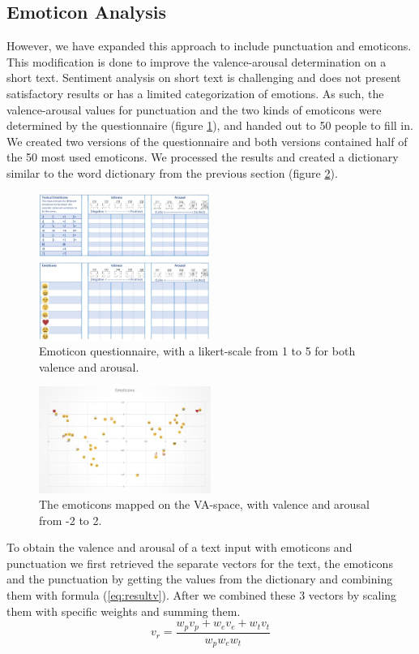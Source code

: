 \documentclass[10pt,journal,compsoc]{IEEEtran}
\begin{document}
\subsection{Emoticon Analysis}
However, we have expanded this approach to include punctuation and emoticons. This modification is done to improve the valence-arousal determination on a short text. Sentiment analysis on short text is challenging and does not present satisfactory results or has a limited categorization of emotions. As such,  the valence-arousal values for punctuation and the two kinds of emoticons were determined by the questionnaire (figure \ref{fig:eq}), and handed out to 50 people to fill in. We created two versions of the questionnaire and both versions contained half of the 50 most used emoticons. We processed the results and created a dictionary similar to the word dictionary from the previous section (figure \ref{fig:emoji}). 
\begin{figure}[h!]
	\centering
	\includegraphics[width=0.5\textwidth]{"EmoticonQuestionnaire"}
	\caption{Emoticon questionnaire, with a likert-scale from 1 to 5 for both valence and arousal.}
	\label{fig:eq}
\end{figure}
\begin{figure}[h!]
	\centering
	\includegraphics[width=0.5\textwidth]{"Emoji"}
	\caption{The emoticons mapped on the VA-space, with valence and arousal from -2 to 2.}
	\label{fig:emoji}
\end{figure}

To obtain the valence and arousal of a text input with emoticons and punctuation we first retrieved the separate vectors for the text, the emoticons and the punctuation by getting the values from the dictionary and combining them with formula (\ref{eq:resultv}). After we combined these 3 vectors by scaling them with specific weights and summing them.
\begin{equation}
v_{r} = \frac{w_{p}v_{p} + w_{e}v_{e} + w_{t}v_{t}}{w_{p}w_{e}w_{t}}
\label{eq:resultv}
\end{equation}
\end{document}
